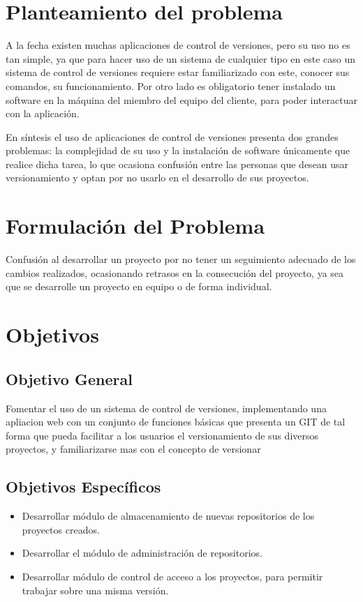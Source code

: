 \documentclass[letterpaper,11pt]{article}
\begin{document}
\section{Planteamiento del problema}
A la fecha existen muchas aplicaciones de control de versiones, pero su uso no es tan simple, ya que para hacer uso de un sistema de cualquier tipo en este caso un sistema de control de versiones requiere estar familiarizado con este, conocer sus comandos, su funcionamiento. Por otro lado es obligatorio tener instalado un software en la máquina del miembro del equipo del cliente, para poder interactuar con la aplicación.

En síntesis el uso  de aplicaciones de control de versiones  presenta dos grandes problemas: la complejidad  de su  uso  y la instalación de  software únicamente que realice dicha tarea, lo que  ocasiona confusión entre las personas que desean usar versionamiento y  optan por no usarlo en el desarrollo de sus proyectos.
\section{Formulación del Problema}
Confusión al desarrollar un proyecto por no tener un seguimiento adecuado de los cambios realizados, ocasionando retrasos en la consecución del proyecto, ya sea que se desarrolle un proyecto en equipo o de forma individual.

\section{Objetivos}
\subsection{Objetivo General}
Fomentar el uso de un sistema de control de versiones, implementando una apliacion web con un conjunto de funciones básicas que presenta un GIT de tal forma que pueda facilitar a los usuarios el versionamiento de sus diversos proyectos, y familiarizarse mas con el concepto de versionar 
\subsection{Objetivos Específicos}
\begin{itemize}
\item Desarrollar módulo de almacenamiento de nuevas repositorios de los proyectos creados.
\item Desarrollar el módulo de administración de repositorios. 
\item Desarrollar módulo de control de acceso a los proyectos, para permitir trabajar sobre una misma versión.
\end{itemize} 
\end{document}
